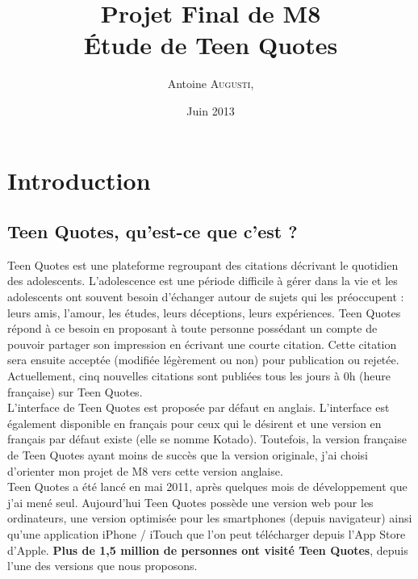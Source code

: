 \documentclass{report}
\title{
		Projet Final de M8\\
		Étude de Teen Quotes
}
\author{
	Antoine \textsc{Augusti}, 
}
\date{Juin 2013}
\begin{document}
	\maketitle

	\tableofcontents

	\chapter{Introduction}
	\section{Teen Quotes, qu'est-ce que c'est ?}
	Teen Quotes est une plateforme regroupant des citations décrivant le quotidien des adolescents. L'adolescence est une période difficile à gérer dans la vie et les adolescents ont souvent besoin d'échanger autour de sujets qui les préoccupent : leurs amis, l'amour, les études, leurs déceptions, leurs expériences. Teen Quotes répond à ce besoin en proposant à toute personne possédant un compte de pouvoir partager son impression en écrivant une courte citation. Cette citation sera ensuite acceptée (modifiée légèrement ou non) pour publication ou rejetée. Actuellement, cinq nouvelles citations sont publiées tous les jours à 0h (heure française) sur Teen Quotes.\\

	L'interface de Teen Quotes est proposée par défaut en anglais. L'interface est également disponible en français pour ceux qui le désirent et une version en français par défaut existe (elle se nomme Kotado). Toutefois, la version française de Teen Quotes ayant moins de succès que la version originale, j'ai choisi d'orienter mon projet de M8 vers cette version anglaise.\\

	Teen Quotes a été lancé en mai 2011, après quelques mois de développement que j'ai mené seul. Aujourd'hui Teen Quotes possède une version web pour les ordinateurs, une version optimisée pour les smartphones (depuis navigateur) ainsi qu'une application iPhone / iTouch que l'on peut télécharger depuis l'App Store d'Apple. \textbf{Plus de 1,5 million de personnes ont visité Teen Quotes}, depuis l'une des versions que nous proposons.\\
\end{document}

